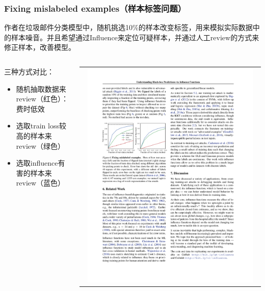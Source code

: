 \documentclass[UTF8]{beamer}
\begin{document}
\begin{frame}
\frametitle{Fixing mislabeled examples（样本标签问题）}
作者在垃圾邮件分类模型中，随机挑选10\%的样本改变标签，用来模拟实际数据中的样本噪音。并且希望通过Influence来定位可疑样本，并通过人工review的方式来修正样本，改善模型。
\begin{columns}[T]
\begin{column}{.48\textwidth}
三种方式对比：
\begin{itemize}
\item 随机抽取数据来review（红色）：费时低效
\item 选取train loss较高的样本来review（绿色）
\item 选取influence有害的样本来review（蓝色）
\end{itemize}
\end{column}
\hfill%
\begin{column}{.48\textwidth}
\begin{tabular}{c}
\includegraphics[width=0.95\textwidth]{flip.pdf}
\end{tabular} 
\end{column}%
\end{columns}
\end{frame}
\end{document}

